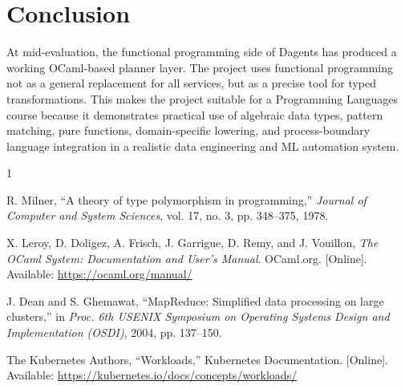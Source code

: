 \documentclass[conference]{IEEEtran}
\begin{document}
\section{Conclusion}

At mid-evaluation, the functional programming side of Dagents has produced a
working OCaml-based planner layer. The project uses functional
programming not as a general replacement for all services, but as a precise tool
for typed transformations. This makes the project suitable for a Programming
Languages course because it demonstrates practical use of algebraic data types,
pattern matching, pure functions, domain-specific lowering, and process-boundary
language integration in a realistic data engineering and ML automation system.

\begin{thebibliography}{1}

R. Milner, ``A theory of type polymorphism in programming,'' \emph{Journal of
Computer and System Sciences}, vol. 17, no. 3, pp. 348--375, 1978.

X. Leroy, D. Doligez, A. Frisch, J. Garrigue, D. Remy, and J. Vouillon,
\emph{The OCaml System: Documentation and User's Manual}. OCaml.org.
[Online]. Available: \url{https://ocaml.org/manual/}

J. Dean and S. Ghemawat, ``MapReduce: Simplified data processing on large
clusters,'' in \emph{Proc. 6th USENIX Symposium on Operating Systems Design and
Implementation (OSDI)}, 2004, pp. 137--150.

The Kubernetes Authors, ``Workloads,'' Kubernetes Documentation. [Online].
Available: \url{https://kubernetes.io/docs/concepts/workloads/}

\end{thebibliography}
\end{document}
